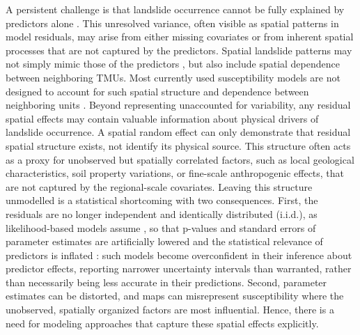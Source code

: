 \documentclass[journal abbreviation, manuscript]{copernicus}
\newcommand{\hl}[1]{#1}
\newcommand{\hlE}[1]{#1}
\begin{document}
A persistent challenge is that landslide occurrence cannot be fully explained by predictors alone \citep{di2023estimation}. 
\hl{This unresolved variance, often visible as spatial patterns in model residuals, may arise from either missing covariates or from inherent spatial processes that are not captured by the predictors. 
Spatial landslide patterns may not simply mimic those of the predictors }\citep{lombardo2020space}\hl{, but also include spatial dependence between neighboring TMUs. 
Most currently used susceptibility models are not designed to account for such spatial structure and dependence between neighboring units }\citep{fang2023space}\hl{.} 
Beyond representing unaccounted for variability, any residual spatial effects may contain valuable information about physical drivers of landslide occurrence.
\hl{A spatial random effect can only demonstrate that residual spatial structure exists, not identify its physical source.
This structure often acts as a proxy for unobserved but spatially correlated factors, such as local geological characteristics, soil property variations, or fine-scale anthropogenic effects, that are not captured by the regional-scale covariates.}
\hlE{Leaving this structure unmodelled is a statistical shortcoming with two consequences. First, the residuals are no longer independent and identically distributed (i.i.d.), as likelihood-based models assume }\citep{wagner2013rethinking}\hlE{, so that p-values and standard errors of parameter estimates are artificially lowered and the statistical relevance of predictors is inflated }\citep{lee2021network, lombardo2020space}\hlE{: such models become overconfident in their inference about predictor effects, reporting narrower uncertainty intervals than warranted, rather than necessarily being less accurate in their predictions. Second, parameter estimates can be distorted, and maps can misrepresent susceptibility where the unobserved, spatially organized factors are most influential. Hence, there is a need for modeling approaches that capture these spatial effects explicitly.}
\end{document}
